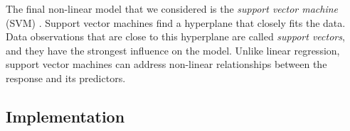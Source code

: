 \documentclass[final,onefignum,onetabnum]{siuro210301}
\begin{document}

	The final non-linear model that we considered is the \textit{support vector machine} (SVM) \cite{cortes1995support, drucker1997support}. Support vector machines find a hyperplane that closely fits the data. Data observations that are close to this hyperplane are called \textit{support vectors}, and they have the strongest influence on the model. Unlike linear regression, support vector machines can address non-linear relationships between the response and its predictors. 
	
	
	\subsection{Implementation}
	
\end{document}
